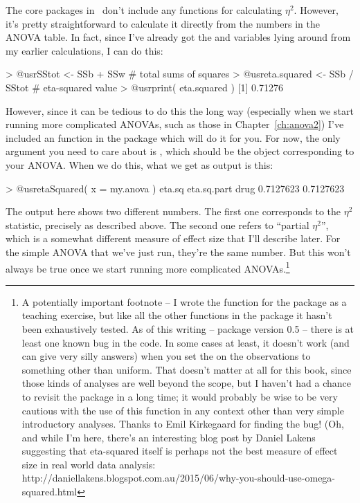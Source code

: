 The core packages in \R\ don't include any functions for calculating $\eta^2$. However, it's pretty straightforward to calculate it directly from the numbers in the ANOVA table. In fact, since I've already got the  and  variables lying around from my earlier calculations, I can do this:
\begin{rblock1}
> @usr{SStot <- SSb + SSw}          # total sums of squares
> @usr{eta.squared <- SSb / SStot}  # eta-squared value
> @usr{print( eta.squared )}
[1] 0.71276
\end{rblock1}
However, since it can be tedious to do this the long way (especially when we start running more complicated ANOVAs, such as those in Chapter~\ref{ch:anova2}) I've included an  function in the  package which will do it for you. For now, the only argument you need to care about is , which should be the  object corresponding to your ANOVA. When we do this, what we get as output is this:
\begin{rblock1}
> @usr{etaSquared( x = my.anova )}
        eta.sq eta.sq.part
drug 0.7127623   0.7127623
\end{rblock1}
The output here shows two different numbers. The first one corresponds to the $\eta^2$ statistic, precisely as described above. The second one refers to ``partial $\eta^2$'', which is a somewhat different measure of effect size that I'll describe later. For the simple ANOVA that we've just run, they're the same number. But this won't always be true once we start running more complicated ANOVAs.\footnote{A potentially important footnote -- I wrote the  function for the  package as a teaching exercise, but like all the other functions in the  package it hasn't been exhaustively tested. As of this writing --  package version 0.5 -- there is at least one known bug in the code. In some cases at least, it doesn't work (and can give very silly answers) when you set the  on the observations to something other than uniform. That doesn't matter at all for this book, since those kinds of analyses are well beyond the scope, but I haven't had a chance to revisit the package in a long time; it would probably be wise to be very cautious with the use of this function in any context other than very simple introductory analyses. Thanks to Emil Kirkegaard for finding the bug! (Oh, and while I'm here, there's an interesting blog post by Daniel Lakens suggesting that eta-squared itself is perhaps not the best measure of effect size in real world data analysis: http://daniellakens.blogspot.com.au/2015/06/why-you-should-use-omega-squared.html}




